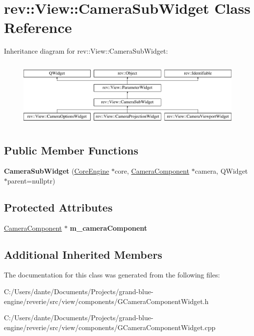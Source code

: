 \hypertarget{classrev_1_1_view_1_1_camera_sub_widget}{}\section{rev\+::View\+::Camera\+Sub\+Widget Class Reference}
\label{classrev_1_1_view_1_1_camera_sub_widget}
Inheritance diagram for rev\+::View\+::Camera\+Sub\+Widget\+:\begin{figure}[H]
\begin{center}
\leavevmode
\includegraphics[height=3.425076cm]{classrev_1_1_view_1_1_camera_sub_widget}
\end{center}
\end{figure}
\subsection*{Public Member Functions}
\begin{DoxyCompactItemize}
\item 
\mbox{\label{classrev_1_1_view_1_1_camera_sub_widget_ae1f1ac3f1364bc8f02cbc7cdf4e0b34c}} 
{\bfseries Camera\+Sub\+Widget} (\mbox{\hyperlink{classrev_1_1_core_engine}{Core\+Engine}} $\ast$core, \mbox{\hyperlink{classrev_1_1_camera_component}{Camera\+Component}} $\ast$camera, Q\+Widget $\ast$parent=nullptr)
\end{DoxyCompactItemize}
\subsection*{Protected Attributes}
\begin{DoxyCompactItemize}
\item 
\mbox{\label{classrev_1_1_view_1_1_camera_sub_widget_a7bbfd4432d61ef57a666b68dfadb8ed6}} 
\mbox{\hyperlink{classrev_1_1_camera_component}{Camera\+Component}} $\ast$ {\bfseries m\+\_\+camera\+Component}
\end{DoxyCompactItemize}
\subsection*{Additional Inherited Members}


The documentation for this class was generated from the following files\+:\begin{DoxyCompactItemize}
\item 
C\+:/\+Users/dante/\+Documents/\+Projects/grand-\/blue-\/engine/reverie/src/view/components/G\+Camera\+Component\+Widget.\+h\item 
C\+:/\+Users/dante/\+Documents/\+Projects/grand-\/blue-\/engine/reverie/src/view/components/G\+Camera\+Component\+Widget.\+cpp\end{DoxyCompactItemize}
